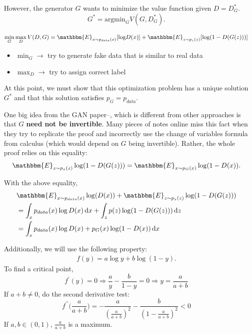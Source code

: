 However, the generator $G$ wants to minimize the value function given $D=D^*_G$. 
\begin{equation*}
G^* = \text{argmin}_G V(G,D_G^*).
\end{equation*}

\begin{equation*}
\min_{G}\max_{D}V(D,G) =  \mathbbm{E}_{x\sim p_{data}(x)}[\textrm{log}D(x)]+\mathbbm{E}_{z\sim p_{z}(z)}[\textrm{log}(1-D(G(z)))]
\end{equation*}
\begin{itemize}
	\item $\min_{G} \rightarrow$ try to generate fake data that is similar to real data
	\item $\max_{D} \rightarrow$ try to assign correct label \footnotemark
\end{itemize}

At this point, we must show that this optimization problem has a unique solution $G^*$ and that this solution satisfies $p_G=p_{data}$.


One big idea from the GAN paper–, which is different from other approaches is that $G$ \textbf{need not be invertible}. Many pieces of notes online miss this fact when they try to replicate the proof and incorrectly use the change of variables formula from calculus (which would depend on $G$ being invertible). Rather, the whole proof relies on this equality:
\begin{equation*}
	\mathbbm{E}_{z \sim p_{z}(z)}\log(1-D(G(z))) = \mathbbm{E}_{x \sim p_{G}(x)}\log(1-D(x)) .
\end{equation*}

With the above equality, 
\begin{align*}
	&\mathbbm{E}_{x \sim p_{data}(x)}\log(D(x))+\mathbbm{E}_{z \sim p_z(z)}\log(1-D(G(z)))\\
	&=\int_{x} p_{data}(x)\log D(x) \, \mathrm{d}x + \int_{z} p(z)\log ( 1- D(G(z))) \, \mathrm{d}z\\ 
	&= \int_{x} p_{data}(x)\log D(x) + p_G(x) \log ( 1- D(x)) \, \mathrm{d}x
\end{align*}

Additionally, we will use the following property:
\begin{align*}
	f(y)= a \log y + b \log(1-y).
\end{align*}
To find a critical point,
$$f^\prime(y) = 0 \Rightarrow \frac{a}{y} - \frac{b}{1-y} = 0 \Rightarrow y = \frac{a}{a+b}$$
If $a+b\neq0$, do the second derivative test:
$$f^{\prime\prime}\big ( \frac{a}{a+b} \big) = - \frac{a}{(\frac{a}{a+b})^2} - \frac{b}{(1-\frac{a}{a+b})^2} < 0
$$
If $a,b\in (0,1)$, $\frac{a}{a+b}$ is a maximum.

